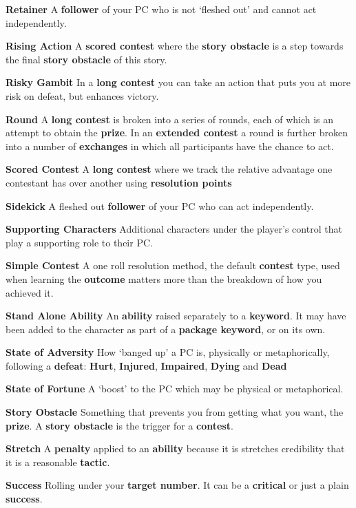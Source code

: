 \documentclass[
]{article}
\begin{document}
\textbf{Retainer} A \textbf{follower} of your PC who is not `fleshed
out' and cannot act independently.

\textbf{Rising Action} A \textbf{scored contest} where the \textbf{story
obstacle} is a step towards the final \textbf{story obstacle} of this
story.

\textbf{Risky Gambit} In a \textbf{long contest} you can take an action
that puts you at more risk on defeat, but enhances victory.

\textbf{Round} A \textbf{long contest} is broken into a series of
rounds, each of which is an attempt to obtain the \textbf{prize}. In an
\textbf{extended contest} a round is further broken into a number of
\textbf{exchanges} in which all participants have the chance to act.

\textbf{Scored Contest} A \textbf{long contest} where we track the
relative advantage one contestant has over another using
\textbf{resolution points}

\textbf{Sidekick} A fleshed out \textbf{follower} of your PC who can act
independently.

\textbf{Supporting Characters} Additional characters under the player's
control that play a supporting role to their PC.

\textbf{Simple Contest} A one roll resolution method, the default
\textbf{contest} type, used when learning the \textbf{outcome} matters
more than the breakdown of how you achieved it.

\textbf{Stand Alone Ability} An \textbf{ability} raised separately to a
\textbf{keyword}. It may have been added to the character as part of a
\textbf{package keyword}, or on its own.

\textbf{State of Adversity} How `banged up' a PC is, physically or
metaphorically, following a \textbf{defeat}: \textbf{Hurt},
\textbf{Injured}, \textbf{Impaired}, \textbf{Dying} and \textbf{Dead}

\textbf{State of Fortune} A `boost' to the PC which may be physical or
metaphorical.

\textbf{Story Obstacle} Something that prevents you from getting what
you want, the \textbf{prize}. A \textbf{story obstacle} is the trigger
for a \textbf{contest}.

\textbf{Stretch} A \textbf{penalty} applied to an \textbf{ability}
because it is stretches credibility that it is a reasonable
\textbf{tactic}.

\textbf{Success} Rolling under your \textbf{target number}. It can be a
\textbf{critical} or just a plain \textbf{success}.
\end{document}
